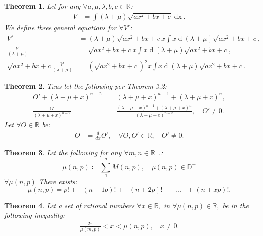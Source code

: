 \documentclass[10pt]{article}
\theoremstyle{plain}
\newtheorem{theorem}{Theorem}[section]
\theoremstyle{definition}
\theoremstyle{remark}
\begin{document}
\begin{theorem}
	Let for any $\forall a, \mu, \lambda, b, c \in \mathbb{R}$:
	\begin{align*}
		V &= \int (\lambda + \mu)\sqrt{ax^2 + bx  +c} \operatorname{dx}.
	\end{align*}
	We define three general equations for $\forall V'$:
	\begin{align*}
		V' &= (\lambda + \mu)\sqrt{ax^2 + bx  +c}x \int x \operatorname{d}(\lambda + \mu)\sqrt{ax^2 + bx  +c},\\
		\frac{V'}{(\lambda + \mu)} &= \sqrt{ax^2 + bx  +c}x \int x \operatorname{d}(\lambda + \mu)\sqrt{ax^2 + bx  +c},\\
		\sqrt{ax^2 + bx  +c}\frac{V'}{(\lambda + \mu)} &= (\sqrt{ax^2 + bx  +c})^{2}x \int x \operatorname{d}(\lambda + \mu)\sqrt{ax^2 + bx  +c}.
	\end{align*}
\end{theorem}

\begin{theorem}
	Thus let the following per Theorem 2.2:
	\begin{align*}
		O' + (\lambda + \mu + x)^{n-2} &= (\lambda + \mu + x)^{n-1} + (\lambda + \mu + x)^{n},\\
		\frac{O'}{(\lambda + \mu + x)^{n-2}} &= \frac{(\lambda + \mu + x)^{n-1} + (\lambda + \mu + x)^{n}}{(\lambda + \mu + x)^{n-2}}, \quad O' \neq 0.
	\end{align*}
	Let $\forall O \in \mathbb{R}$ be:
	\begin{align*}
		O &= \frac{d}{dx} O', \quad \forall O, O' \in \mathbb{R}, \quad O' \neq 0.
	\end{align*}
\end{theorem}

\begin{theorem}
	Let the following for any $\forall m, n \in \mathbb{R}^{+}.$:
\begin{equation}
    \mu(n, p) \coloneq \sum_{n}^{p} M(n, p), \quad \mu(n, p) \in \mathbb{D}^{+}
\end{equation}
	$\forall \mu(n, p)$ There exists:
\begin{equation}
    \mu(n, p) = p! + \text{ } (n+1p)! + \text{ } (n+2p)! + \text{ } \dots \text{ } + (n+xp)!.
\end{equation}
\end{theorem}

\begin{theorem}
	Let a set of rational numbers $\forall x \in \mathbb{R},$ in $\forall \mu(n, p) \in \mathbb{R},$ be in the following inequality:
	\begin{align*}
		\frac{2\pi}{\mu(m, p)} < x < \mu(n, p), \quad x \neq 0.
	\end{align*}
\end{theorem}
\end{document}
